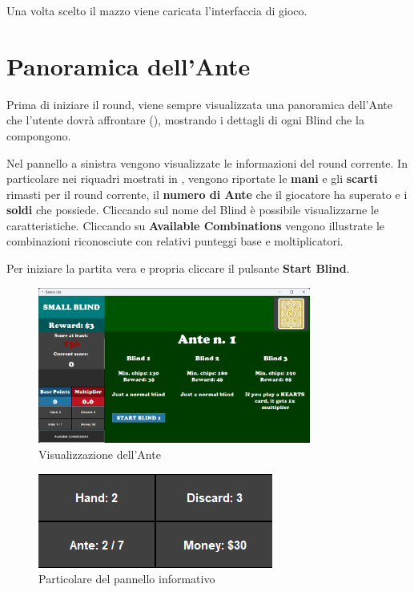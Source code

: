\documentclass[a4paper,12pt]{report}
\begin{document}
Una volta scelto il mazzo viene caricata l'interfaccia di gioco.

\section{Panoramica dell'Ante}

Prima di iniziare il round, viene sempre visualizzata una panoramica dell'Ante che l'utente dovrà affrontare (), mostrando i dettagli di ogni Blind che la compongono.

Nel pannello a sinistra vengono visualizzate le informazioni del round corrente.
In particolare nei riquadri mostrati in , vengono riportate le \textbf{mani} e gli \textbf{scarti} rimasti per il round corrente, il \textbf{numero di Ante} che il giocatore ha superato e i \textbf{soldi} che possiede.
Cliccando sul nome del Blind è possibile visualizzarne le caratteristiche.
Cliccando su \textbf{Available Combinations} vengono illustrate le combinazioni riconosciute con relativi punteggi base e moltiplicatori.

Per iniziare la partita vera e propria cliccare il pulsante \textbf{Start Blind}.

\begin{figure}[H]
	\centering{}
	\includegraphics[width=0.8\textwidth]{img/guida/03-AnteView.png}
	\caption{Visualizzazione dell'Ante}
	\label{img:guida:ante}
\end{figure}

\begin{figure}[H]
	\centering{}
	\includegraphics{img/guida/09-InfoPanel}
	\caption{Particolare del pannello informativo}
	\label{img:guida:infopanel}
\end{figure}
\end{document}
